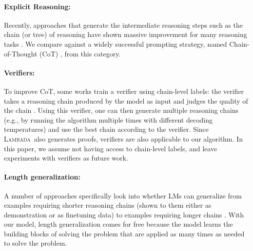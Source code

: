 \documentclass[11pt]{article}
\newcommand{\algo}{\textsc{Lambada}}
\begin{document}
\paragraph{Explicit Reasoning:} Recently, approaches that generate the intermediate reasoning steps such as the chain (or tree) of reasoning \cite{wei2022chain,nye2022show,dalvi2021explaining,zelikman2022star,zhang2022improved} have shown massive improvement for many reasoning tasks \cite{suzgun2022challenging}. We compare against a widely successful prompting strategy, named Chain-of-Thought (CoT) \cite{wei2022chain}, from this category. 

\paragraph{Verifiers:} To improve CoT, some works train a verifier using chain-level labels: the verifier takes a reasoning chain produced by the model as input and judges the quality of the chain \cite{cobbe2021training,shen2021generate,jhamtani2020learning,zelikman2022star}. Using this verifier, one can then generate multiple reasoning chains (e.g., by running the algorithm multiple times with different decoding temperatures) and use the best chain according to the verifier. Since \algo\ also generates proofs, verifiers are also applicable to our algorithm. 
In this paper, we assume not having access to chain-level labels, and leave experiments with verifiers as future work.

\paragraph{Length generalization:} A number of approaches specifically look into whether LMs can generalize from examples requiring shorter reasoning chains (shown to them either as demonstration or as finetuning data) to examples requiring longer chains \cite{anil2022exploring,tafjord2020proofwriter}. With our model, length generalization comes for free because the model learns the building blocks of solving the problem that are applied as many times as needed to solve the problem. 
\end{document}
